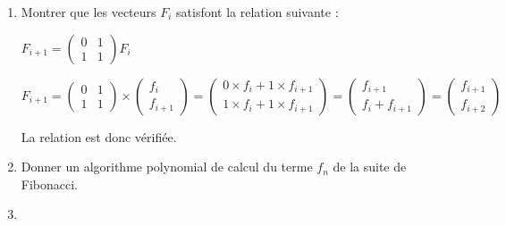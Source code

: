 \documentclass[a4paper,10pt]{article}
\begin{document}
	\begin{enumerate}
	\item
		Montrer que les vecteurs $F_i$ satisfont la relation suivante :
		
		$F_{i+1}=\begin{pmatrix}
						0 & 1 \\		
						1 & 1
						\end{pmatrix}F_i$
		
		$F_{i+1}=\begin{pmatrix}
						0 & 1 \\		
						1 & 1
						\end{pmatrix}\times
						\begin{pmatrix} 
							f_i \\
							f_{i+1} 
						\end{pmatrix}
					=\begin{pmatrix}
						0 \times f_i+1 \times f_{i+1}\\		
						1 \times f_i+1 \times f_{i+1}
						\end{pmatrix}
					=\begin{pmatrix}
						f_{i+1}\\		
						f_i+f_{i+1}
						\end{pmatrix}
					=\begin{pmatrix}
						f_{i+1}\\		
						f_{i+2}
						\end{pmatrix}$
			
		La relation est donc vérifiée.			
	\item
	Donner un algorithme polynomial de calcul du terme $f_n$ de la suite de Fibonacci.
	
	\item
	
	\end{enumerate}		
	
	
		
	
	 
\end{document}
